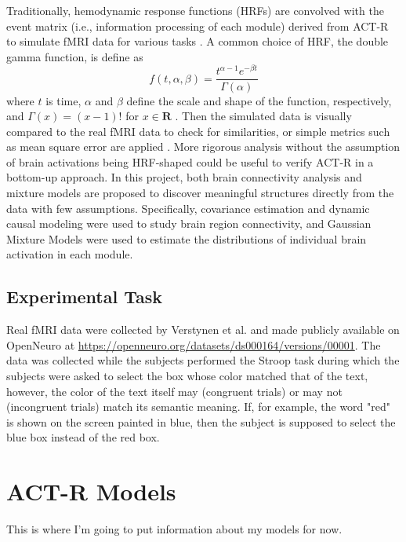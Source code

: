 \documentclass[10pt,letterpaper]{article}
\begin{document}
Traditionally, hemodynamic response functions (HRFs) are convolved with the event matrix (i.e., information processing of each module) derived from ACT-R to simulate fMRI data for various tasks \cite{Anderson2004,Lindquist2009}. A common choice of HRF, the double gamma function, is define as 
\[f(t, \alpha, \beta) = \frac{t^{\alpha - 1}e^{-\beta t}}{\Gamma(\alpha)}\]
where $t$ is time, $\alpha$ and $\beta$ define the scale and shape of the function, respectively, and $\Gamma(x) = (x - 1)!$ for $x \in \mathbf{R}$ \cite{Poldrack, Cignetti2016}. Then the simulated data is visually compared to the real fMRI data to check for similarities, or simple metrics such as mean square error are applied \cite{Anderson2004, Borst2017}. More rigorous analysis without the assumption of brain activations being HRF-shaped could be useful to verify ACT-R in a bottom-up approach. In this project, both brain connectivity analysis and mixture models are proposed to discover meaningful structures directly from the data with few assumptions. Specifically, covariance estimation and dynamic causal modeling were used to study brain region connectivity, and Gaussian Mixture Models were used to estimate the distributions of individual brain activation in each module.

\subsection{Experimental Task}
Real fMRI data were collected by Verstynen et al. \cite{Verstynen2014} and made publicly available on OpenNeuro at  \url{https://openneuro.org/datasets/ds000164/versions/00001}. The data was collected while the subjects performed the Stroop task \cite{Stroop1935} during which the subjects were asked to select the box whose color matched that of the text, however, the color of the text itself may (congruent trials) or may not (incongruent trials) match its semantic meaning. If, for example, the word "red" is shown on the screen painted in blue, then the subject is supposed to select the blue box instead of the red box.

\section{ACT-R Models}
This is where I'm going to put information about my models for now. 
\end{document}

